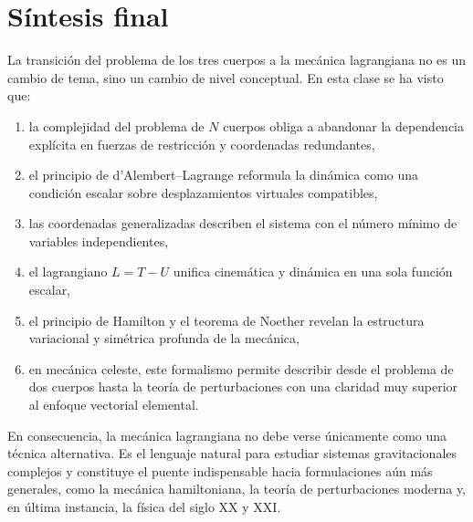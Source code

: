 \section{Síntesis final}
La transición del problema de los tres cuerpos a la mecánica lagrangiana no es un cambio de tema, sino un cambio de nivel conceptual. En esta clase se ha visto que:
\begin{enumerate}
    \item la complejidad del problema de \(N\) cuerpos obliga a abandonar la dependencia explícita en fuerzas de restricción y coordenadas redundantes,
    \item el principio de d'Alembert--Lagrange reformula la dinámica como una condición escalar sobre desplazamientos virtuales compatibles,
    \item las coordenadas generalizadas describen el sistema con el número mínimo de variables independientes,
    \item el lagrangiano \(L=T-U\) unifica cinemática y dinámica en una sola función escalar,
    \item el principio de Hamilton y el teorema de Noether revelan la estructura variacional y simétrica profunda de la mecánica,
    \item en mecánica celeste, este formalismo permite describir desde el problema de dos cuerpos hasta la teoría de perturbaciones con una claridad muy superior al enfoque vectorial elemental.
\end{enumerate}

En consecuencia, la mecánica lagrangiana no debe verse únicamente como una técnica alternativa. Es el lenguaje natural para estudiar sistemas gravitacionales complejos y constituye el puente indispensable hacia formulaciones aún más generales, como la mecánica hamiltoniana, la teoría de perturbaciones moderna y, en última instancia, la física del siglo XX y XXI.